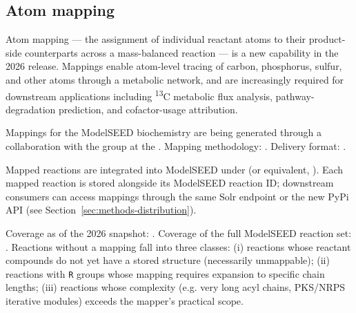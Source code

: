 \subsection{Atom mapping}\label{sec:methods-atom-mapping}

Atom mapping --- the assignment of individual reactant atoms to their
product-side counterparts across a mass-balanced reaction --- is a new
capability in the 2026 release. Mappings enable atom-level tracing of carbon,
phosphorus, sulfur, and other atoms through a metabolic network, and are
increasingly required for downstream applications including
\textsuperscript{13}C metabolic flux analysis, pathway-degradation prediction,
and cofactor-usage attribution.

Mappings for the ModelSEED biochemistry are being generated through a
collaboration with the \TBD[group] group at the \TBD[institution]. Mapping
methodology: . Delivery format: .

Mapped reactions are integrated into ModelSEED under
 (or equivalent, \TBD{}). Each mapped reaction
is stored alongside its ModelSEED reaction ID; downstream consumers can access
mappings through the same Solr endpoint or the new PyPi API (see
Section~\ref{sec:methods-distribution}).

Coverage as of the 2026 snapshot: . Coverage of the full ModelSEED reaction set: \TBD{}.
Reactions without a mapping fall into three classes: (i) reactions whose
reactant compounds do not yet have a stored structure (necessarily unmappable);
(ii) reactions with \texttt{R} groups whose mapping requires expansion to
specific chain lengths; (iii) reactions whose complexity (e.g. very long acyl
chains, PKS/NRPS iterative modules) exceeds the mapper's practical scope.
